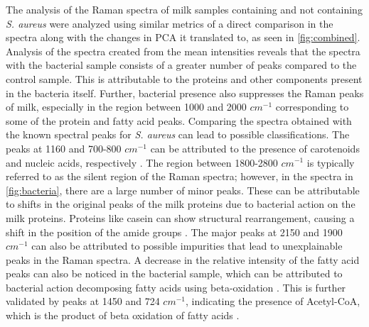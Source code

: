 \noindent The analysis of the Raman spectra of milk samples containing and not containing \textit{S. aureus} were analyzed using similar metrics of a direct comparison in the spectra along with the changes in PCA it translated to, as seen in \autoref{fig:combined}. Analysis of the spectra created from the mean intensities reveals that the spectra with the bacterial sample consists of a greater number of peaks compared to the control sample. This is attributable to the proteins and other components present in the bacteria itself. Further, bacterial presence also suppresses the Raman peaks of milk, especially in the region between 1000 and 2000 $cm^{-1}$ corresponding to some of the protein and fatty acid peaks. Comparing the spectra obtained with the known spectral peaks for \textit{S. aureus} can lead to possible classifications. The peaks at 1160 and 700-800 $cm^{-1}$ can be attributed to the presence of carotenoids and nucleic acids, respectively \cite{Liu2025_RamanSingleCell}. The region between 1800-2800 $cm^{-1}$ is typically referred to as the silent region of the Raman spectra; however, in the spectra in \autoref{fig:bacteria}, there are a large number of minor peaks. These can be attributable to shifts in the original peaks of the milk proteins due to bacterial action on the milk proteins. Proteins like casein can show structural rearrangement, causing a shift in the position of the amide groups \cite{Movasaghi2007}. The major peaks at 2150 and 1900 $cm^{-1}$ can also be attributed to possible impurities that lead to unexplainable peaks in the Raman spectra. A decrease in the relative intensity of the fatty acid peaks can also be noticed in the bacterial sample, which can be attributed to bacterial action decomposing fatty acids using beta-oxidation \cite{Kuiack2023_fadXDEBA}. This is further validated by peaks at 1450 and 724 $cm^{-1}$, indicating the presence of Acetyl-CoA, which is the product of beta oxidation of fatty acids \cite{Wang2023_RiP_SERS_DeepOcean}. \\

